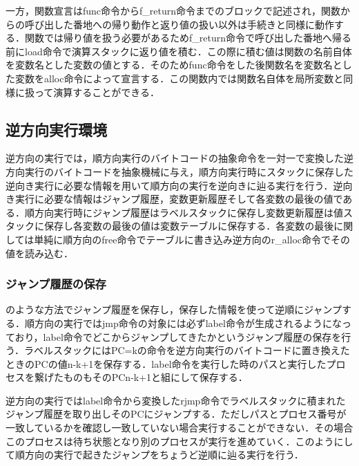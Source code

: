 \documentclass[submit,PRO]{ipsj}
\begin{document}
一方，関数宣言はfunc命令からf\_return命令までのブロックで記述され，関数からの呼び出した番地への帰り動作と返り値の扱い以外は手続きと同様に動作する．関数では帰り値を扱う必要があるためf\_return命令で呼び出した番地へ帰る前にload命令で演算スタックに返り値を積む．この際に積む値は関数の名前自体を変数名とした変数の値とする．そのためfunc命令をした後関数名を変数名とした変数をalloc命令によって宣言する．この関数内では関数名自体を局所変数と同様に扱って演算することができる．



\subsection{逆方向実行環境}
\label{sec:4.2}

逆方向の実行では，順方向実行のバイトコードの抽象命令を一対一で変換した逆方向実行のバイトコードを抽象機械に与え，順方向実行時にスタックに保存した逆向き実行に必要な情報を用いて順方向の実行を逆向きに辿る実行を行う．逆向き実行に必要な情報はジャンプ履歴，変数更新履歴そして各変数の最後の値である．順方向実行時にジャンプ履歴はラベルスタックに保存し変数更新履歴は値スタックに保存し各変数の最後の値は変数テーブルに保存する．各変数の最後に関しては単純に順方向のfree命令でテーブルに書き込み逆方向のr\_alloc命令でその値を読み込む．


\subsubsection{ジャンプ履歴の保存}


のような方法でジャンプ履歴を保存し，保存した情報を使って逆順にジャンプする．順方向の実行ではjmp命令の対象には必ずlabel命令が生成されるようになっており，label命令でどこからジャンプしてきたかというジャンプ履歴の保存を行う．ラベルスタックにはPC=kの命令を逆方向実行のバイトコードに置き換えたときのPCの値n-k+1を保存する．label命令を実行した時のパスと実行したプロセスを繋げたものもそのPCn-k+1と組にして保存する．

逆方向の実行ではlabel命令から変換したrjmp命令でラベルスタックに積まれたジャンプ履歴を取り出しそのPCにジャンプする．ただしパスとプロセス番号が一致しているかを確認し一致していない場合実行することができない．その場合このプロセスは待ち状態となり別のプロセスが実行を進めていく．このようにして順方向の実行で起きたジャンプをちょうど逆順に辿る実行を行う．
\end{document}
